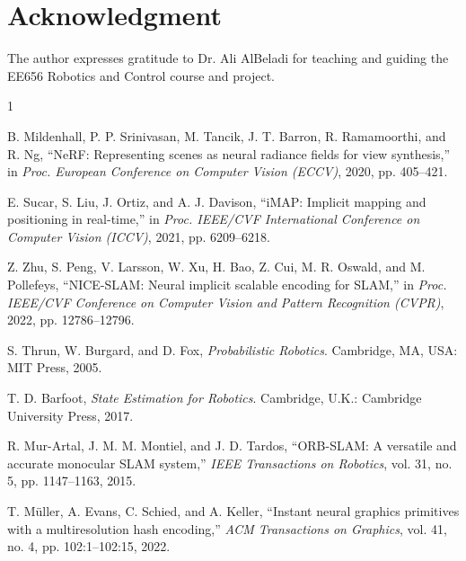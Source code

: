 \documentclass[conference]{IEEEtran}
\begin{document}
\section*{Acknowledgment}
The author expresses gratitude to Dr. Ali AlBeladi for teaching and guiding the EE656 Robotics and Control course and project.

\balance
\begin{thebibliography}{1}

B. Mildenhall, P. P. Srinivasan, M. Tancik, J. T. Barron, R. Ramamoorthi, and R. Ng, ``NeRF: Representing scenes as neural radiance fields for view synthesis,'' in \emph{Proc. European Conference on Computer Vision (ECCV)}, 2020, pp. 405--421.

E. Sucar, S. Liu, J. Ortiz, and A. J. Davison, ``iMAP: Implicit mapping and positioning in real-time,'' in \emph{Proc. IEEE/CVF International Conference on Computer Vision (ICCV)}, 2021, pp. 6209--6218.

Z. Zhu, S. Peng, V. Larsson, W. Xu, H. Bao, Z. Cui, M. R. Oswald, and M. Pollefeys, ``NICE-SLAM: Neural implicit scalable encoding for SLAM,'' in \emph{Proc. IEEE/CVF Conference on Computer Vision and Pattern Recognition (CVPR)}, 2022, pp. 12786--12796.

S. Thrun, W. Burgard, and D. Fox, \emph{Probabilistic Robotics}. Cambridge, MA, USA: MIT Press, 2005.

T. D. Barfoot, \emph{State Estimation for Robotics}. Cambridge, U.K.: Cambridge University Press, 2017.

R. Mur-Artal, J. M. M. Montiel, and J. D. Tardos, ``ORB-SLAM: A versatile and accurate monocular SLAM system,'' \emph{IEEE Transactions on Robotics}, vol. 31, no. 5, pp. 1147--1163, 2015.

T. M\"uller, A. Evans, C. Schied, and A. Keller, ``Instant neural graphics primitives with a multiresolution hash encoding,'' \emph{ACM Transactions on Graphics}, vol. 41, no. 4, pp. 102:1--102:15, 2022.

\end{thebibliography}
\end{document}

